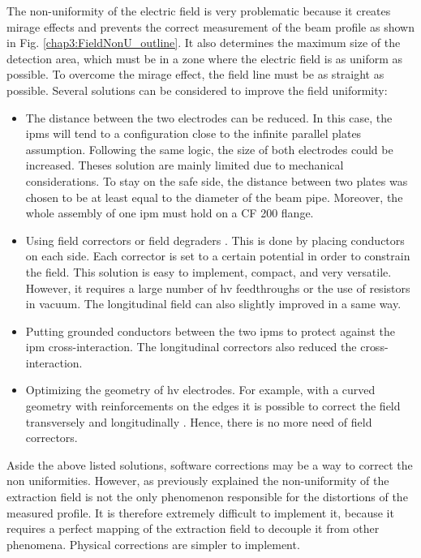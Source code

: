 \begin{refsection}
  The non-uniformity of the electric field is very problematic because it creates mirage effects and prevents the correct measurement of the beam profile as shown in Fig. \ref{chap3:FieldNonU_outline}. It also determines the maximum size of the detection area, which must be in a zone where the electric field is as uniform as possible. To overcome the mirage effect, the field line must be as straight as possible. Several solutions can be considered to improve the field uniformity:
  \begin{itemize}
    \item The distance between the two electrodes can be reduced. In this case, the \acrshort{ipm}s will tend to a configuration close to the infinite parallel plates assumption. Following the same logic, the size of both electrodes could be increased. Theses solution are mainly limited due to mechanical considerations. To stay on the safe side, the distance between two plates was chosen to be at least equal to the diameter of the beam pipe. Moreover, the whole assembly of one \acrshort{ipm} must hold on a CF 200 flange.
    \item Using field correctors or field degraders \cite[p. 103]{egber2012}. This is done by placing conductors on each side. Each corrector is set to a certain potential in order to constrain the field. This solution is easy to implement, compact, and very versatile. However, it requires a large number of \acrshort{hv} feedthroughs or the use of resistors in vacuum. The longitudinal field can also slightly improved in a same way.
    \item Putting grounded conductors between the two \acrshort{ipm}s \cite[p. 132]{egber2012} to protect against the \acrshort{ipm} cross-interaction. The longitudinal correctors also reduced the cross-interaction.
    \item Optimizing the geometry of \acrshort{hv} electrodes. For example, with a curved geometry with reinforcements on the edges it is possible to correct the field transversely and longitudinally \cite{Bartkoski2014}. Hence, there is no more need of field correctors.
  \end{itemize}
  Aside the above listed solutions, software corrections may be a way to correct the non uniformities. However, as previously explained the non-uniformity of the extraction field is not the only phenomenon responsible for the distortions of the measured profile. It is therefore extremely difficult to implement it, because it requires a perfect mapping of the extraction field to decouple it from other phenomena. Physical corrections are simpler to implement.


\end{refsection}
